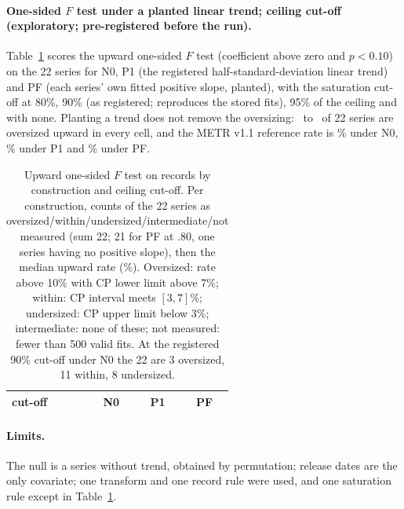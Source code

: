 \documentclass[aps,pre,twocolumn,superscriptaddress,nofootinbib,9pt]{revtex4-2}
\begin{document}
\paragraph*{One-sided $F$ test under a planted linear trend; ceiling cut-off (exploratory; pre-registered before the run).} Table~\ref{tab:satcut} scores the upward one-sided $F$ test (coefficient above zero and $p<0.10$) on the 22 series for N0, P1 (the registered half-standard-deviation linear trend) and PF (each series' own fitted positive slope, planted), with the saturation cut-off at 80\%, 90\% (as registered; reproduces the stored fits), 95\% of the ceiling and with none. Planting a trend does not remove the oversizing: \satOverMin\ to \satOverMax\ of 22 series are oversized upward in every cell, and the METR v1.1 reference rate is \mbRefIidOne\% under N0, \satRefP\% under P1 and \satRefPF\% under PF.
\begin{table}[H]
\caption{Upward one-sided $F$ test on records by construction and ceiling cut-off. Per construction, counts of the 22 series as oversized/within/undersized/intermediate/not measured (sum 22; 21 for PF at .80, one series having no positive slope), then the median upward rate (\%). Oversized: rate above 10\% with CP lower limit above 7\%; within: CP interval meets $[3,7]\%$; undersized: CP upper limit below 3\%; intermediate: none of these; not measured: fewer than 500 valid fits. At the registered 90\% cut-off under N0 the 22 are 3 oversized, 11 within, 8 undersized.}
\label{tab:satcut}
\scriptsize\setlength{\tabcolsep}{2pt}
\begin{ruledtabular}
\begin{tabular}{lcccccc}
cut-off & \multicolumn{2}{c}{N0} & \multicolumn{2}{c}{P1} & \multicolumn{2}{c}{PF} \\
\hline

\end{tabular}
\end{ruledtabular}
\end{table}

\paragraph*{Limits.} The null is a series without trend, obtained by permutation; release dates are the only covariate; one transform and one record rule were used, and one saturation rule except in Table~\ref{tab:satcut}.
\end{document}
